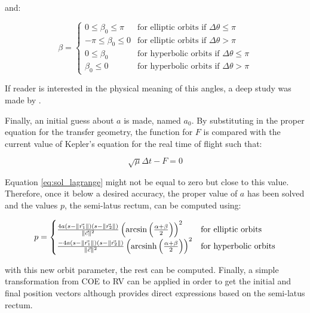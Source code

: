 and:

\begin{equation}
  \beta =
  \begin{cases}
	  0 \leqslant \beta_0 \leqslant \pi & \text{for elliptic orbits if $\Delta \theta \leqslant \pi$} \\
	  -\pi \leqslant \beta_0 \leqslant 0 & \text{for elliptic orbits if $\Delta \theta > \pi$} \\
	  0 \leqslant \beta_0 & \text{for hyperbolic orbits if $\Delta \theta \leqslant \pi$} \\
	  \beta_0 \leqslant 0 & \text{for hyperbolic orbits if $\Delta \theta > \pi$}
  \end{cases}
\end{equation}

If reader is interested in the physical meaning of this angles, a deep study was
made by \cite{prussing1979}.

Finally, an initial guess about $a$ is made, named $a_0$. By substituting in the
proper equation for the transfer geometry, the function for $F$ is compared with
the current value of Kepler's equation for the real time of flight such that:

\begin{equation}
	\sqrt{\mu} \Delta t - F = 0
	\label{eq:sol_lagrange}
\end{equation}

Equation \ref{eq:sol_lagrange} might not be equal to zero but close to this
value. Therefore, once it below a desired accuracy, the proper value of $a$ has
been solved and the values $p$, the semi-latus rectum, can be computed using:

\begin{equation}
 p = 
  \begin{cases}
  \frac{4a(s - \lVert\vec{r_1}\rVert)(s - \lVert\vec{r_2}\rVert)}{\lVert\vec{c}\rVert^2} \left(\arcsin{\left(\frac{\alpha + \beta}{2} \right)}\right)^{2} & \text{for elliptic orbits}\\ 
  \frac{-4a(s - \lVert\vec{r_1}\rVert)(s - \lVert\vec{r_2}\rVert)}{\lVert\vec{c}\rVert^2} \left(\operatorname{arcsinh}{\left(\frac{\alpha + \beta}{2} \right)}\right)^{2} & \text{for hyperbolic  orbits}\\
  \end{cases}
\end{equation}

with this new orbit parameter, the rest can be computed. Finally, a simple
transformation from COE to RV can be applied in order to get the initial and
final position vectors although \cite{jiang2016} provides direct expressions
based on the semi-latus rectum.
